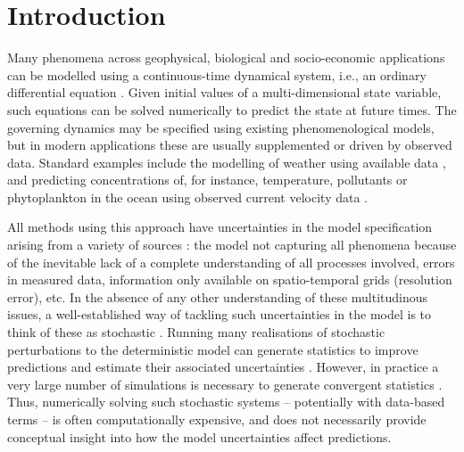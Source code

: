 \section{Introduction}
Many phenomena across geophysical, biological and socio-economic applications can be modelled using a continuous-time dynamical system, i.e., an ordinary differential equation \cite[e.g.]{BrauerCastillo-Chavez_2012_MathematicalModelsPopulation,TelEtAl_2005_ChemicalBiologicalActivity,Wiggins_2005_DynamicalSystemsApproach}. 
Given initial values of a multi-dimensional state variable, such equations can be solved numerically to predict the state at future times.
The governing dynamics may be specified using existing phenomenological models, but in modern applications these are usually supplemented or driven by observed data.  
Standard examples include the modelling of weather using available data \cite{LawEtAl_2015_DataAssimilationMathematical,ReichCotter_2015_ProbabilisticForecastingBayesian}, and predicting concentrations of, for instance, temperature, pollutants or phytoplankton in the ocean using observed current velocity data \cite{AbascalEtAl_2009_ApplicationHFRadar,dOvidioEtAl_2010_FluidDynamicalNiches}.

All methods using this approach have uncertainties in the model specification arising from a variety of sources \cite{FangEtAl_2020_DisentanglingResolutionPrecision}: the model not capturing all phenomena because of the inevitable lack of a complete understanding of all processes involved, errors in measured data, information only available on spatio-temporal grids (resolution error), etc.  
In the absence of any other understanding of these multitudinous issues, a well-established way of tackling such uncertainties in the model is to think of these as stochastic 
\cite{BernerEtAl_2017_StochasticParameterizationNew,Oksendal_2003_StochasticDifferentialEquations}. 
Running many realisations of stochastic perturbations to the deterministic model can generate statistics to improve predictions and estimate their associated uncertainties \cite[e.g.]{BadzaEtAl_2023_HowSensitiveAre,Collins_2007_EnsemblesProbabilitiesNew}.
However, in practice a very large number of simulations is necessary to generate convergent statistics \cite{FepponLermusiaux_2018_DynamicallyOrthogonalNumerical, Leutbecher_2019_EnsembleSizeHow}.
Thus, numerically solving such stochastic systems -- potentially with data-based terms -- is often computationally expensive, and does not necessarily provide conceptual insight into how the model uncertainties affect predictions.

